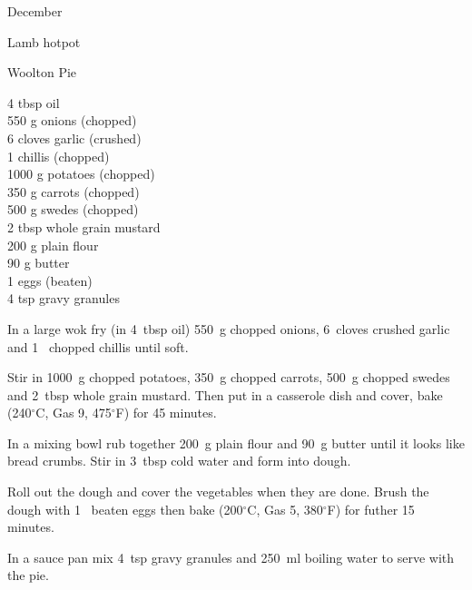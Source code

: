 \begin{menu}{December}
\begin{recipe}{2}{Lamb hotpot}
\begin{instructions}
    \end{instructions}
    \end{recipe}%
  
    \begin{recipe}{2}{Woolton Pie}%
		\begin{ingredients}
		4 tbsp oil  \\
	550 g onions (chopped) \\
	6 cloves garlic (crushed) \\
	1  chillis (chopped) \\
	1000 g potatoes (chopped) \\
	350 g carrots (chopped) \\
	500 g swedes (chopped) \\
	2 tbsp whole grain mustard  \\
	200 g plain flour  \\
	90 g butter  \\
	1  eggs (beaten) \\
	4 tsp gravy granules  \\
	
		\end{ingredients}
	
    \begin{instructions}
    \item 
        In a large wok fry
        (in 4~tbsp  oil)
        550~g chopped onions,
        6~cloves crushed garlic
        and
        1~ chopped chillis
        until soft.
      \item 
        Stir in
        1000~g chopped potatoes,
        350~g chopped carrots,
        500~g chopped swedes
        and
        2~tbsp  whole grain mustard.
        Then put in a casserole dish and cover,
        bake (240$^{\circ}$C, Gas 9, 475$^{\circ}$F) for 45 minutes.
      \item 
        In a mixing bowl
        rub together
        200~g  plain flour
        and
        90~g  butter
        until it looks like bread crumbs.
        Stir in
        3~tbsp  cold water
        and form into dough.
      \item 
        Roll out the dough and cover the vegetables when they are done.
        Brush the dough with 1~ beaten eggs
        then bake (200$^{\circ}$C, Gas 5, 380$^{\circ}$F) for futher 15 minutes.
      \item 
        In a sauce pan mix
        4~tsp  gravy granules
        and
        250~ml  boiling water
        to serve with the pie.
      

\end{instructions}
\end{recipe}
\end{menu}
